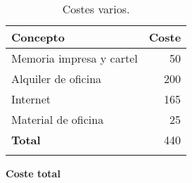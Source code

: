 \begin{longtable}[]{@{}lr@{}}
	\toprule
	\begin{minipage}[b]{0.48\columnwidth}\raggedright\strut
		\textbf{Concepto}\strut
	\end{minipage} & \begin{minipage}[b]{0.18\columnwidth}\raggedright\strut
		\textbf{Coste}\strut
	\end{minipage}\tabularnewline
	\midrule
	\endhead
	\begin{minipage}[t]{0.48\columnwidth}\raggedright\strut
		Memoria impresa y cartel\strut
	\end{minipage} & \begin{minipage}[t]{0.18\columnwidth}\raggedright\strut
		50 \officialeuro\strut
	\end{minipage}\tabularnewline
	\begin{minipage}[t]{0.48\columnwidth}\raggedright\strut
		Alquiler de oficina\strut
	\end{minipage} & \begin{minipage}[t]{0.18\columnwidth}\raggedright\strut
		200 \officialeuro\strut
	\end{minipage}\tabularnewline
	\begin{minipage}[t]{0.48\columnwidth}\raggedright\strut
		Internet\strut
	\end{minipage} & \begin{minipage}[t]{0.18\columnwidth}\raggedright\strut
		165 \officialeuro\strut
	\end{minipage}\tabularnewline
	\begin{minipage}[t]{0.48\columnwidth}\raggedright\strut
		Material de oficina\strut
	\end{minipage} & \begin{minipage}[t]{0.18\columnwidth}\raggedright\strut
		25 \officialeuro\strut
	\end{minipage}\tabularnewline
	\midrule
	\begin{minipage}[t]{0.48\columnwidth}\raggedright\strut
		\textbf{Total}\strut
	\end{minipage} & \begin{minipage}[t]{0.18\columnwidth}\raggedright\strut
		440 \officialeuro\strut
	\end{minipage}\tabularnewline
	\bottomrule
	\caption{Costes varios.}
\end{longtable}

\textbf{Coste total}

